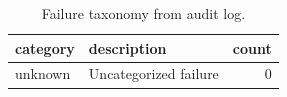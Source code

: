 \begin{table}
\caption{Failure taxonomy from audit log.}
\label{tab:failure_taxonomy}
\begin{tabular}{llr}
\toprule
category & description & count \\
\midrule
unknown & Uncategorized failure & 0 \\
\bottomrule
\end{tabular}
\end{table}
